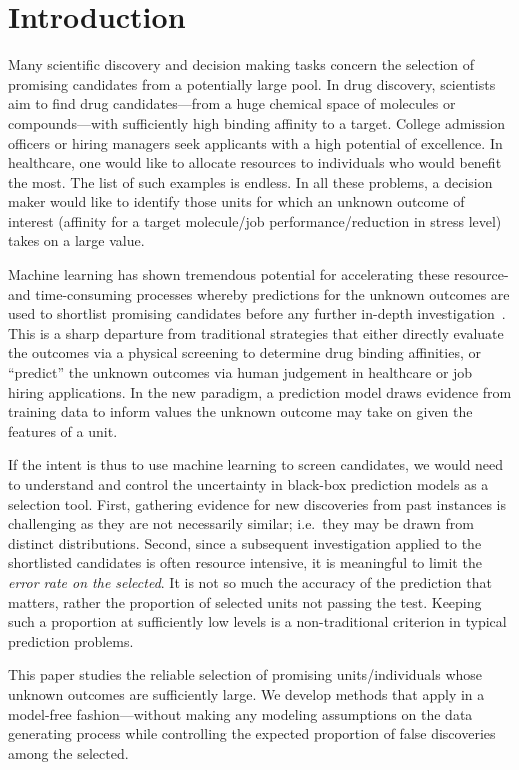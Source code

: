 \section{Introduction}
Many scientific discovery and decision making tasks concern the selection
of promising candidates from a potentially large pool. In drug discovery,
scientists aim to find
drug candidates---from a huge
chemical space of molecules or compounds---with sufficiently
high binding affinity to a target.
College admission officers or hiring managers seek applicants with a high potential
of excellence. In healthcare, one would like to allocate resources to individuals
who would benefit the most. The list of such examples is endless.
In all these problems, a decision maker would like to identify those units for which
an unknown outcome  of interest (affinity for a target molecule/job performance/reduction in stress level) takes on a large value.

Machine learning has shown tremendous potential for accelerating these
resource- and time-consuming processes whereby
predictions for the unknown outcomes are used to
shortlist promising candidates before any further in-depth investigation~\cite{lavecchia2013virtual,carpenter2018machine,sajjadiani2019using}.
This is a sharp departure from traditional strategies that either
directly evaluate the outcomes via a physical screening to determine drug binding
affinities, or ``predict'' the unknown outcomes via human judgement
in healthcare or job hiring applications.
In the new paradigm, a prediction model draws evidence from training data
to inform values the unknown outcome may take on given the features of a unit.

If the intent is thus to use machine learning to screen candidates,
we would need to understand and control
the uncertainty in black-box prediction models as a selection tool.
First, gathering evidence for new discoveries from past instances
is challenging as they are not necessarily similar; i.e.~they may be drawn from distinct distributions.
Second, since a subsequent investigation applied to the shortlisted candidates
is often resource intensive, it is meaningful to limit the \emph{error rate on the selected}. It is not so much the accuracy of the prediction that matters, rather the proportion of selected units not passing the test.  Keeping such a proportion at sufficiently low levels is a non-traditional criterion in typical prediction problems.

This paper studies the reliable selection of promising units/individuals whose unknown outcomes
are sufficiently large. We develop methods that apply in a model-free fashion---without making any modeling assumptions on the data generating process while controlling the expected proportion of false discoveries among the selected.


